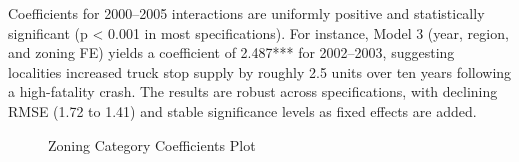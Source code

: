 \documentclass[
  8pt,
  12pt]{article}
\begin{document}
Coefficients for 2000--2005 interactions are uniformly positive and
statistically significant (p \textless{} 0.001 in most specifications).
For instance, Model 3 (year, region, and zoning FE) yields a coefficient
of 2.487*** for 2002--2003, suggesting localities increased truck stop
supply by roughly 2.5 units over ten years following a high-fatality
crash. The results are robust across specifications, with declining RMSE
(1.72 to 1.41) and stable significance levels as fixed effects are
added.

\begin{figure}


\caption{\label{fig-zonign_categories}Zoning Category Coefficients Plot}

\end{figure}%
\end{document}
